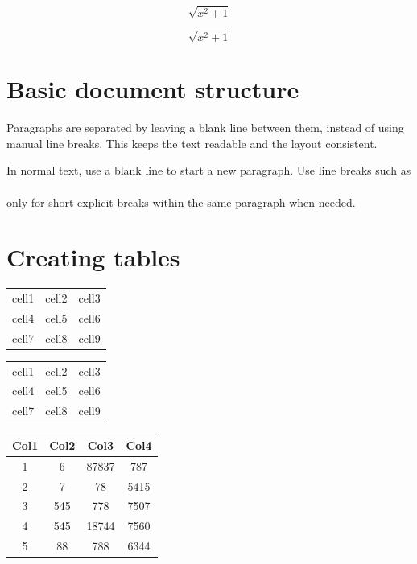 \documentclass[12pt, letterpaper]{article}
\begin{document}
\begin{displaymath}
\sqrt{x^2+1}
\end{displaymath}

\begin{equation*}
\sqrt{x^2+1}
\end{equation*}

\section{Basic document structure}

Paragraphs are separated by leaving a blank line between them, instead of using manual line breaks. This keeps the text readable and the layout consistent.

In normal text, use a blank line to start a new paragraph. Use line breaks such as \\\\ only for short explicit breaks within the same paragraph when needed.

\section{Creating tables}

\begin{center}
\begin{tabular}{c c c}
 cell1 & cell2 & cell3 \\
 cell4 & cell5 & cell6 \\
 cell7 & cell8 & cell9
\end{tabular}
\end{center}

\begin{center}
\begin{tabular}{|c|c|c|}
 \hline
 cell1 & cell2 & cell3 \\
 cell4 & cell5 & cell6 \\
 cell7 & cell8 & cell9 \\
 \hline
\end{tabular}
\end{center}

\begin{center}
 \begin{tabular}{cccc}
 \toprule
 Col1 & Col2 & Col3 & Col4 \\
 \midrule
 1 & 6 & 87837 & 787 \\
 2 & 7 & 78 & 5415 \\
 3 & 545 & 778 & 7507 \\
 4 & 545 & 18744 & 7560 \\
 5 & 88 & 788 & 6344 \\
 \bottomrule
\end{tabular}
\end{center}
\end{document}
